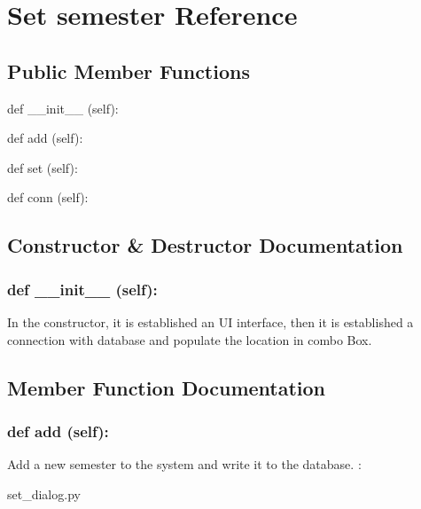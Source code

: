 \hypertarget{Set_semester}{\section{Set semester Reference}
\label{Set_semester}
}
\subsection*{Public Member Functions}
\begin{DoxyCompactItemize}
\item 
def {\_\_init\_\_} (self):
\item 
def {add} (self):
\item 
def {set} (self):
\item 
def {conn} (self):
\end{DoxyCompactItemize}

\subsection{Constructor \& Destructor Documentation}
\hypertarget{class_poly_aa3def076b74bed67904976ad4f9fe9b1}{
\subsubsection[{def __init__ (self):}]{\setlength{\rightskip}{0pt plus 5cm}def {\_\_init\_\_} (self): 
}}
In the constructor, it is established an UI interface, then it is  established a connection with database and populate the location in combo Box.
 

\subsection{Member Function Documentation}
\hypertarget{class_poly_a14a7ad77ce612b0c54f531d307ee4b39}{
\subsubsection[{def add (self):}]{\setlength{\rightskip}{0pt plus 5cm}def {add} (self):}}\label{class_poly_a14a7ad77ce612b0c54f531d307ee4b39}
Add a new semester to the system and write it to the database.
:\begin{DoxyCompactItemize}
\item 
set\_dialog.\-py\end{DoxyCompactItemize}

